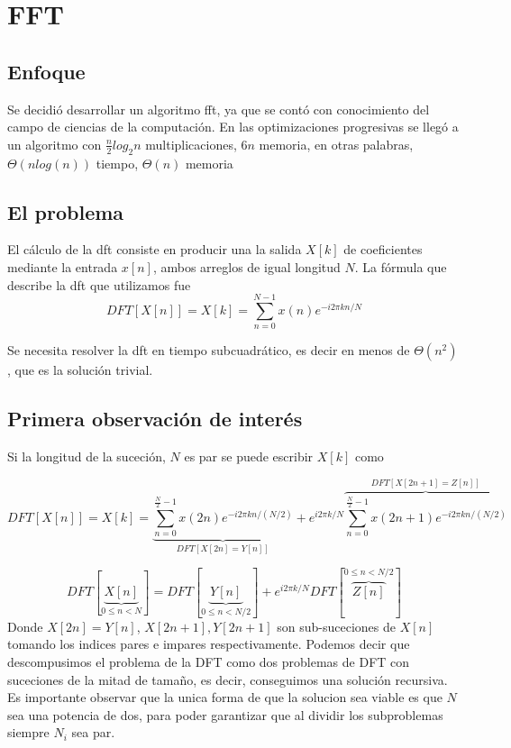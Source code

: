 \documentclass[assd_tp2_main.tex]{subfiles}
\begin{document}
\section{FFT}

\subsection{Enfoque}
Se decidió desarrollar un algoritmo fft, ya que se contó con conocimiento del campo de ciencias de la computación. En las optimizaciones progresivas se llegó a un algoritmo con $\frac{n}{2}log_2{n}$ multiplicaciones, $6n$ memoria, en otras palabras, $\Theta(nlog(n))$ tiempo, $\Theta(n)$ memoria 

\subsection{El problema}
El cálculo de la dft consiste en producir una la salida $X[k]$ de coeficientes mediante la entrada $x[n]$, ambos arreglos de igual longitud $N$. La fórmula que describe la dft que utilizamos fue
\begin{equation}
	DFT[X[n]] = X[k]=\sum_{n=0}^{N-1}x(n)e^{-i2\pi kn/N}
\end{equation}

Se necesita resolver la dft en tiempo subcuadrático, es decir en menos de $\Theta(n^2)$, que es la solución trivial.

\subsection{Primera observación de interés}
Si la longitud de la suceción, $N$ es par se puede escribir $X[k]$ como

\begin{equation}
	DFT[X[n]] = X[k]=
		\underbrace{
		\sum_{n=0}^{\frac{N}{2}-1}x(2n)e^{-i2\pi k n/(N/2)}
		}_{DFT[X[2n]=Y[n]]} +
		e^{i2\pi k /N}
		\overbrace{		
		\sum_{n=0}^{\frac{N}{2}-1}x(2n+1)e^{-i2\pi k n/(N/2)}
		}^{DFT[X[2n+1] = Z[n]]}
\end{equation}

\begin{equation}
	DFT[\underbrace{X[n]}_{0\leq n< N}]=DFT[\underbrace{Y[n]}_{0\leq n<N/2}]+e^{i2\pi k /N}DFT[\overbrace{Z[n]}^{0\leq n<N/2}]
\end{equation}
Donde $X[2n]=Y[n]$, $X[2n+1], Y[2n+1]$ son sub-suceciones de $X[n]$ tomando los indices pares e impares respectivamente.
Podemos decir que descompusimos el problema de la DFT como dos problemas de DFT con suceciones de la mitad de tamaño, es decir, conseguimos una solución recursiva. Es importante observar que la unica forma de que la solucion sea viable es que $N$ sea una potencia de dos, para poder garantizar que al dividir los subproblemas siempre $N_i$ sea par.
\end{document}
